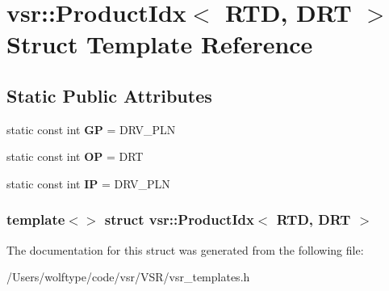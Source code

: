 \hypertarget{structvsr_1_1_product_idx_3_01_r_t_d_00_01_d_r_t_01_4}{\section{vsr\-:\-:Product\-Idx$<$ R\-T\-D, D\-R\-T $>$ Struct Template Reference}
\label{structvsr_1_1_product_idx_3_01_r_t_d_00_01_d_r_t_01_4}
}
\subsection*{Static Public Attributes}
\begin{DoxyCompactItemize}
\item 
\hypertarget{structvsr_1_1_product_idx_3_01_r_t_d_00_01_d_r_t_01_4_ac43905600de582ee964c110d6c0176db}{static const int {\bfseries G\-P} = D\-R\-V\-\_\-\-P\-L\-N}\label{structvsr_1_1_product_idx_3_01_r_t_d_00_01_d_r_t_01_4_ac43905600de582ee964c110d6c0176db}

\item 
\hypertarget{structvsr_1_1_product_idx_3_01_r_t_d_00_01_d_r_t_01_4_a5ee9c69095819a8c4555db7c559c85cf}{static const int {\bfseries O\-P} = D\-R\-T}\label{structvsr_1_1_product_idx_3_01_r_t_d_00_01_d_r_t_01_4_a5ee9c69095819a8c4555db7c559c85cf}

\item 
\hypertarget{structvsr_1_1_product_idx_3_01_r_t_d_00_01_d_r_t_01_4_a1f28f7d24fde185ebdbb4aea2b666081}{static const int {\bfseries I\-P} = D\-R\-V\-\_\-\-P\-L\-N}\label{structvsr_1_1_product_idx_3_01_r_t_d_00_01_d_r_t_01_4_a1f28f7d24fde185ebdbb4aea2b666081}

\end{DoxyCompactItemize}
\subsubsection*{template$<$$>$ struct vsr\-::\-Product\-Idx$<$ R\-T\-D, D\-R\-T $>$}



The documentation for this struct was generated from the following file\-:\begin{DoxyCompactItemize}
\item 
/\-Users/wolftype/code/vsr/\-V\-S\-R/vsr\-\_\-templates.\-h\end{DoxyCompactItemize}
